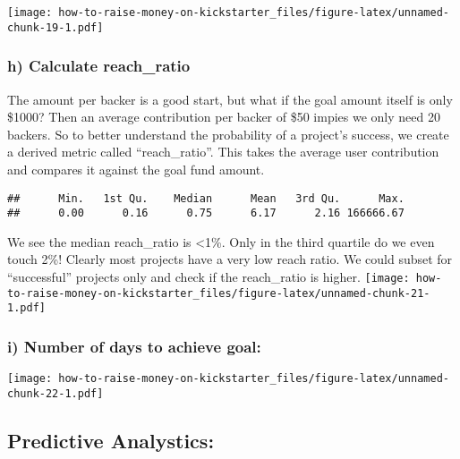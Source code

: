 \documentclass[]{article}
\newenvironment{Shaded}{\begin{snugshade}}{\end{snugshade}}
\newcommand{\KeywordTok}[1]{\textcolor[rgb]{0.13,0.29,0.53}{\textbf{#1}}}
\newcommand{\DataTypeTok}[1]{\textcolor[rgb]{0.13,0.29,0.53}{#1}}
\newcommand{\StringTok}[1]{\textcolor[rgb]{0.31,0.60,0.02}{#1}}
\newcommand{\OperatorTok}[1]{\textcolor[rgb]{0.81,0.36,0.00}{\textbf{#1}}}
\newcommand{\NormalTok}[1]{#1}
\begin{document}
\begin{Shaded}
\end{Shaded}

\texttt{[image: how-to-raise-money-on-kickstarter\_files/figure-latex/unnamed-chunk-19-1.pdf]}

\subsubsection{h) Calculate reach\_ratio}\label{h-calculate-reach_ratio}

 The amount per backer is a good start, but what if the goal amount
itself is only \$1000? Then an average contribution per backer of \$50
impies we only need 20 backers. So to better understand the probability
of a project's success, we create a derived metric called
``reach\_ratio''. This takes the average user contribution and compares
it against the goal fund amount.

\begin{verbatim}
##      Min.   1st Qu.    Median      Mean   3rd Qu.      Max. 
##      0.00      0.16      0.75      6.17      2.16 166666.67
\end{verbatim}

 We see the median reach\_ratio is \textless{}1\%. Only in the third
quartile do we even touch 2\%! Clearly most projects have a very low
reach ratio. We could subset for ``successful'' projects only and check
if the reach\_ratio is higher.
\texttt{[image: how-to-raise-money-on-kickstarter\_files/figure-latex/unnamed-chunk-21-1.pdf]}

\subsubsection{i) Number of days to achieve
goal:}\label{i-number-of-days-to-achieve-goal}

\texttt{[image: how-to-raise-money-on-kickstarter\_files/figure-latex/unnamed-chunk-22-1.pdf]}

\subsection{\texorpdfstring{{Predictive
Analystics:}}{Predictive Analystics:}}\label{predictive-analystics}
\end{document}
